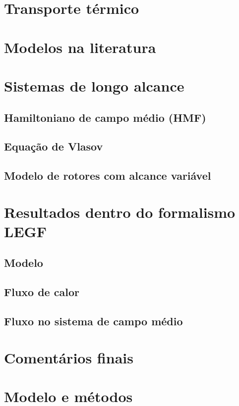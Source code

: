 \documentclass[8pt]{beamer}
\begin{document}
\begin{frame}{  }
\printbibliography[heading=subbibliography]

\end{frame}
%
%
%


\section{Transporte térmico}
\section{Modelos na literatura} \label{sec:ModelsHT}
\section{Sistemas de longo alcance} \label{sec:IntroLongRange}
\subsection{Hamiltoniano de campo médio (HMF)}
\subsection{Equação de Vlasov}
\subsection{Modelo de rotores com alcance variável} \label{ch:alphaXY}
\section{Resultados dentro do formalismo LEGF}
\subsection{Modelo}
\subsection{Fluxo de calor}
\subsection{Fluxo no sistema de campo médio}
\section{Comentários finais}
\section{Modelo e métodos}
\end{document}

